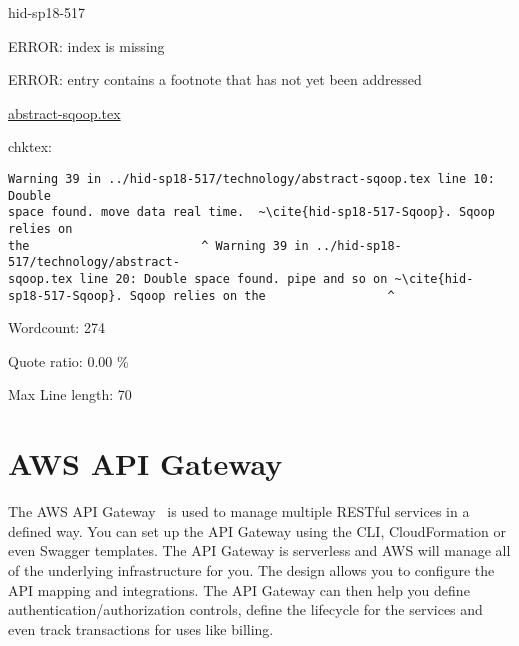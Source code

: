 \begin{IU}

hid-sp18-517

ERROR: index is missing

ERROR: entry contains a footnote that has not yet been addressed

\href{https://github.com/cloudmesh-community/hid-sp18-517/blob/master//technology/abstract-sqoop.tex}{abstract-sqoop.tex}

 
chktex:
\begin{tiny}
\begin{verbatim}
Warning 39 in ../hid-sp18-517/technology/abstract-sqoop.tex line 10: Double
space found. move data real time.  ~\cite{hid-sp18-517-Sqoop}. Sqoop relies on
the                        ^ Warning 39 in ../hid-sp18-517/technology/abstract-
sqoop.tex line 20: Double space found. pipe and so on ~\cite{hid-
sp18-517-Sqoop}. Sqoop relies on the                 ^
\end{verbatim}
\end{tiny}

Wordcount: 274


Quote ratio: 0.00 \%
 
Max Line length: 70
\end{IU}

\section{AWS API Gateway}

The AWS API Gateway~\cite{hid-sp18-518-AWS-APIGateway} is used to manage
multiple RESTful services in a defined way. You can set up the API Gateway
using the CLI, CloudFormation or even Swagger templates. The API Gateway is
serverless and AWS will manage all of the underlying infrastructure for you. 
The design allows you to configure the API mapping and integrations. The API 
Gateway can then help you define authentication/authorization controls, 
define the lifecycle for the services and even track transactions for uses
like billing.




